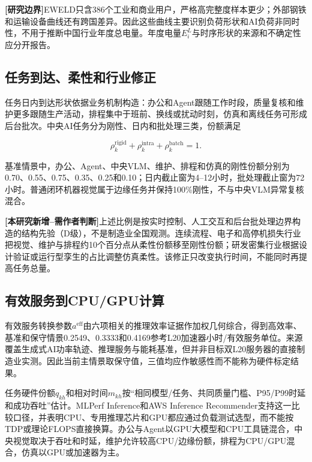 \documentclass[preprint]{elsarticle}
\newcommand{\newwork}{\textcolor{orange!80!black}{\textbf{[本研究新增--需作者判断]}}}
\newcommand{\boundary}{\textcolor{black!65}{\textbf{[研究边界]}}}
\begin{document}
\boundary EWELD只含386个工业和商业用户，严格高完整度样本更少；外部钢铁和运输设备曲线还有跨国差异。因此这些曲线主要识别负荷形状和AI负荷非同时性，不用于推断中国行业年度总电量。年度电量$E_i^L$与时序形状的来源和不确定性应分开报告。

\subsection{任务到达、柔性和行业修正}

任务日内到达形状依据业务机制构造：办公和Agent跟随工作时段，质量复核和维护更多跟随生产活动，排程集中于班前、换线或扰动时刻，仿真和离线任务可形成后台批次。中央AI任务分为刚性、日内和批处理三类，份额满足

\begin{equation}
 \rho_k^{\mathrm{rigid}}+\rho_k^{\mathrm{intra}}
 +\rho_k^{\mathrm{batch}}=1.
 \label{eq:flexibility-shares}
\end{equation}

基准情景中，办公、Agent、中央VLM、维护、排程和仿真的刚性份额分别为0.70、0.55、0.75、0.35、0.25和0.10；日内截止窗为4--12小时，批处理截止窗为72小时。普通闭环机器视觉属于边缘任务并保持100\%刚性，不与中央VLM异常复核混合。

\newwork 上述比例是按实时控制、人工交互和后台批处理边界构造的结构先验（D级），不是制造业全国观测。连续流程、电子和高停机损失行业把视觉、维护与排程约10个百分点从柔性份额移至刚性份额；研发密集行业根据设计验证或运行型孪生的占比调整仿真柔性。该修正只改变执行时间，不能同时再提高任务总量。

\subsection{有效服务到CPU/GPU计算}

有效服务转换参数$a^{\mathrm{eff}}$由六项相关的推理效率证据作加权几何综合，得到高效率、基准和保守情景0.2549、0.3333和0.4169参考L20加速器小时/有效服务单位。来源覆盖生成式AI功率轨迹、推理服务与能耗基准，但并非目标双L20服务器的直接制造业实测。因此当前主情景取保守值，三值均应作敏感性而不能称为硬件标定结果。

任务硬件份额$q_{kh}$和相对时间$m_{kh}$按“相同模型/任务、共同质量门槛、P95/P99时延和成功吞吐”估计。MLPerf Inference和AWS Inference Recommender支持这一比较口径，并表明CPU、专用推理芯片和GPU都应通过负载测试选型，而不能按TDP或理论FLOPS直接换算\cite{mlperf,AWSrecommender}。办公与Agent以GPU大模型和CPU工具链混合，中央视觉取决于吞吐和时延，维护允许较高CPU/边缘份额，排程为CPU/GPU混合，仿真以GPU或加速器为主。
\end{document}
